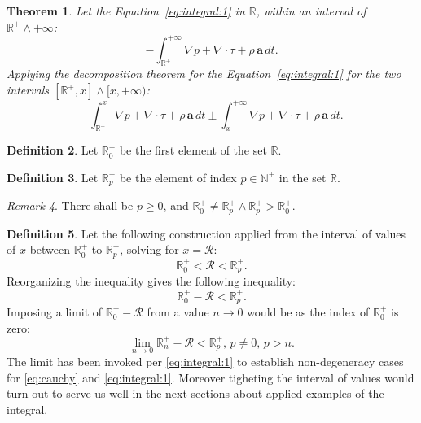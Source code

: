 \documentclass[10pt]{article}
\theoremstyle{plain}
\newtheorem{theorem}{Theorem}[section]
\theoremstyle{definition}
\newtheorem{definition}[theorem]{Definition}
\theoremstyle{remark}
\newtheorem{remark}[theorem]{Remark}
\begin{document}
\begin{theorem}
  \label{ex:1}
  Let the Equation~\ref{eq:integral:1} in $\mathbb{R}$, within an interval of $\mathbb{R}^{+} \land +\infty$:
  \begin{equation}
      - \int_{\mathbb{R}^{+}}^{+\infty} \nabla p + \nabla \cdot \tau + \rho \, \textbf{a} \, dt.
  \end{equation}
  Applying the decomposition theorem for the Equation~\ref{eq:integral:1} for the two intervals $[\mathbb{R}^{+}, x] \land [x, +\infty)$:
  \begin{equation}
      - \int_{\mathbb{R}^{+}}^{x} \nabla p + \nabla \cdot \tau + \rho \, \textbf{a} \, dt \pm \int_{x}^{+\infty} \nabla p + \nabla \cdot \tau + \rho \, \textbf{a} \, dt.
  \end{equation}
\end{theorem}
\begin{definition}
  Let $\mathbb{R}^{+}_0$ be the first element of the set $\mathbb{R}$.
\end{definition}
\begin{definition}
  Let $\mathbb{R}^{+}_p$ be the element of index $p \in \mathbb{N}^{+}$ in the set $\mathbb{R}$.
\end{definition}
\begin{remark}
  There shall be $p \geq 0$, and $\mathbb{R}^{+}_0 \neq \mathbb{R}^{+}_p \land \mathbb{R}^{+}_p > \mathbb{R}^{+}_0$.
\end{remark}
\begin{definition}
  Let the following construction applied from the interval of values of $x$ between $\mathbb{R}^{+}_0$ to $\mathbb{R}^{+}_{p}$, solving for $x=\mathcal{R}$:
  \begin{equation}
    \mathbb{R}^{+}_0 < \mathcal{R} < \mathbb{R}^{+}_{p}.
  \end{equation}
  Reorganizing the inequality gives the following inequality:
  \begin{equation}
    \mathbb{R}^{+}_0 - \mathcal{R} < \mathbb{R}^{+}_{p}.
  \end{equation}
  Imposing a limit of $\mathbb{R}^{+}_0 - \mathcal{R}$ from a value $n \to 0$ would be as the index of $\mathbb{R}^{+}_0$ is zero:
  \begin{equation}
    \lim_{n \to 0} \mathbb{R}^{+}_n - \mathcal{R} < \mathbb{R}^{+}_{p}, \, p \neq 0, \, p > n.
  \end{equation}
  The limit has been invoked per \ref{eq:integral:1} to establish non-degeneracy cases for \ref{eq:cauchy} and \ref{eq:integral:1}. Moreover tigheting the interval of values would turn out to serve us well in the next sections about applied examples of the integral.
\end{definition}
\end{document}
